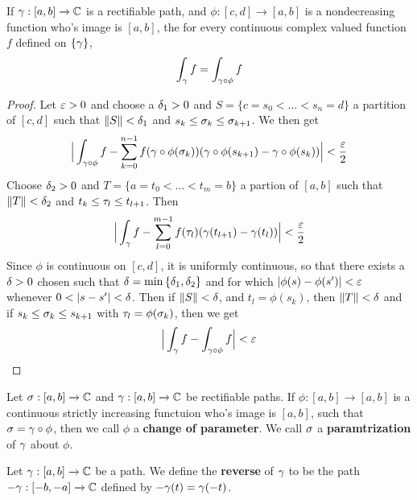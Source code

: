 \begin{theorem}\label{4.2.2}
    If $\gamma:[a,b] \xrightarrow{} \mathbb{C}$ is a rectifiable path, and $\phi:[c,d]
    \xrightarrow{} [a,b]$ is a nondecreasing function who's image is $[a,b]$,
    the for every continuous complex valued function $f$ defined on  $\{\gamma\}$,
    \begin{equation*}
        \int_\gamma{f}=\int_{\gamma \circ \phi}{f}
    \end{equation*}
\end{theorem}
\begin{proof}
    Let $\varepsilon>0$ and choose a  $\delta_1>0$ and $S=\{c=s_0<\dots<s_n=d\}$ a
    partition of $[c,d]$ such that $\|S\|<\delta_1$ and $s_k \leq \sigma_k \leq
    \sigma_{k+1}$. We then get
    \begin{equation*}
        \Big{|} \int_{\gamma \circ \phi}{f}-
        \sum_{k=0}^{n-1}{f(\gamma \circ \phi(\sigma_k))
            (\gamma \circ \phi(s_{k+1})-\gamma \circ \phi(s_k))} \Big{|}<\frac{\varepsilon}{2}
    \end{equation*}
    Choose $\delta_2>0$ and $T=\{a=t_0<\dots<t_m=b\}$ a partion of $[a,b]$ such that
    $\|T\|<\delta_2$ and $t_k \leq \tau_l \leq t_{l+1}$. Then
    \begin{equation*}
        \Big{|} \int_\gamma{f}-\sum_{l=0}^{m-1}{f(\tau_l)(\gamma(t_{l+1})-\gamma(t_l))} \Big{|}
        < \frac{\varepsilon}{2}
    \end{equation*}
    Since $\phi$ is continuous on $[c,d]$, it is uniformly continuous, so that
    there exists a $\delta>0$ chosen such that $\delta=\min{\{\delta_1,\delta_2\}}$ and for
    which $|\phi(s)-\phi(s')|<\varepsilon$ whenever $0<|s-s'|<\d$. Then if $\|S\|<\delta$,
    and  $t_l=\phi(s_k)$, then $\|T\|<\delta$ and if $s_k \leq \sigma_k \leq s_{k+1}$
    with $\tau_l=\phi(\sigma_k)$, then we get
    \begin{equation*}
        \Big{|} \int_\gamma{f}-\int_{\gamma \circ \phi}{f} \Big{|}<\varepsilon
    \end{equation*}
\end{proof}

\begin{definition}
    Let $\sigma:[a,b] \xrightarrow{} \mathbb{C}$ and $\gamma:[a,b] \xrightarrow{} \mathbb{C}$ be
    rectifiable paths. If $\phi:[a,b] \xrightarrow{} [a,b]$ is a continuous
    strictly increasing functuion who's image is $[a,b]$, such that $\sigma=\gamma \circ
    \phi$, then we call  $\phi$ a \textbf{change of parameter}. We call $\sigma$ a
     \textbf{paramtrization} of $\gamma$ about  $\phi$.
\end{definition}

\begin{definition}
    Let $\gamma:[a,b] \xrightarrow{} \mathbb{C}$ be a path. We define the \textbf{reverse}
    of $\gamma$ to be the path $-\gamma:[-b,-a] \xrightarrow{} \mathbb{C}$ defined by
    $-\gamma(t)=\gamma(-t)$.
\end{definition}

